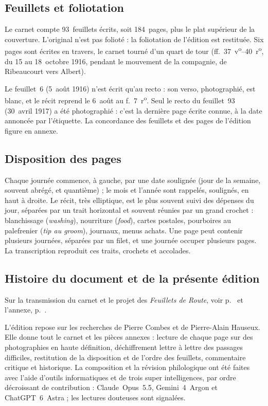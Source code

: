 \subsection{Feuillets et foliotation}

Le carnet compte 93~feuillets écrits, soit 184~pages, plus le plat supérieur de la couverture. L'original n'est pas folioté : la foliotation de l'édition est restituée. Six pages sont écrites en travers, le carnet tourné d'un quart de tour (ff.~37~v\textsuperscript{o}--40~r\textsuperscript{o}, du 15 au 18~octobre 1916, pendant le mouvement de la compagnie, de Ribeaucourt vers Albert).

Le feuillet~6 (5~août 1916) n'est écrit qu'au recto : son verso, photographié, est blanc, et le récit reprend le 6~août au f.~7~r\textsuperscript{o}. Seul le recto du feuillet~93 (30~avril 1917) a été photographié : c'est la dernière page écrite connue, à la date annoncée par l'étiquette. La concordance des feuillets et des pages de l'édition figure en annexe.

\subsection{Disposition des pages}

Chaque journée commence, à gauche, par une date soulignée (jour de la semaine, souvent abrégé, et quantième) ; le mois et l'année sont rappelés, soulignés, en haut à droite. Le récit, très elliptique, est le plus souvent suivi des dépenses du jour, séparées par un trait horizontal et souvent réunies par un grand crochet : blanchissage (\textit{washing}), nourriture (\textit{food}), cartes postales, pourboires au palefrenier (\textit{tip au groom}), journaux, menus achats. Une page peut contenir plusieurs journées, séparées par un filet, et une journée occuper plusieurs pages. La transcription reproduit ces traits, crochets et accolades.

\subsection{Histoire du document et de la présente édition}

Sur la transmission du carnet et le projet des \textit{Feuillets de Route}, voir p.~\pageref{intro:transmission} et l'annexe, p.~\pageref{annexe:doc6}.

L'édition repose sur les recherches de Pierre Combes et de Pierre-Alain Hauseux. Elle donne tout le carnet et les pièces annexes : lecture de chaque page sur des photographies en haute définition, déchiffrement lettre à lettre des passages difficiles, restitution de la disposition et de l'ordre des feuillets, commentaire critique et historique. La composition et la révision philologique ont été faites avec l'aide d'outils informatiques et de trois super intelligences, par ordre décroissant de contribution : Claude~Opus~5.5, Gemini~4~Argon et ChatGPT~6~Astra ; les lectures douteuses sont signalées.
